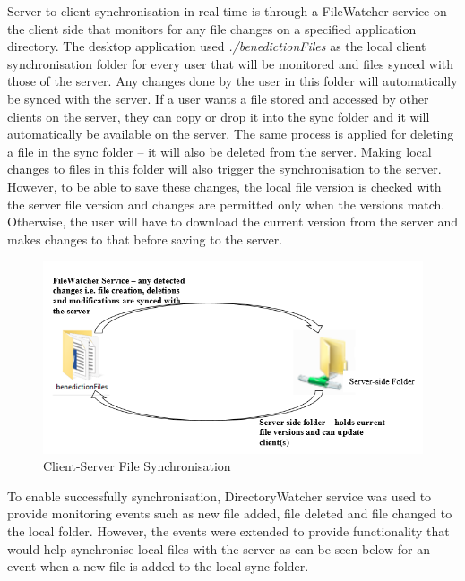 \documentclass{article}
\begin{document}
Server to client synchronisation in real time is through a FileWatcher service on the client side that monitors for any file changes on a specified application directory. The desktop application used \emph{./benedictionFiles} as the local client synchronisation folder for every user that will be monitored and files synced with those of the server. Any changes done by the user in this folder will automatically be synced with the server. If a user wants a file stored and accessed by other clients on the server, they can copy or drop it into the sync folder and it will automatically be available on the server. The same process is applied for deleting a file in the sync folder – it will also be deleted from the server. Making local changes to files in this folder will also trigger the synchronisation to the server. However, to be able to save these changes, the local file version is checked with the server file version and changes are permitted only when the versions match. Otherwise, the user will have to download the current version from the server and makes changes to that before saving to the server.

\begin{figure}[H]
\begin{center}
\includegraphics[width=15cm]{fileSync.PNG}
\end{center}
\caption{Client-Server File Synchronisation}\label{ex4}
\end{figure}

To enable successfully synchronisation, DirectoryWatcher service \cite{c14} was used to provide monitoring events such as new file added, file deleted and file changed to the local folder. However, the events were extended to provide functionality that would help synchronise local files with the server as can be seen below for an event when a new file is added to the local sync folder.
\end{document}
